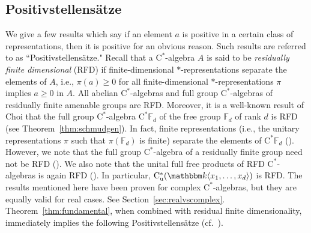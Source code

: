 \documentclass[12pt]{amsart}
\theoremstyle{definition}
\begin{document}
\subsection{Positivstellens\"atze}
We give a few results which say if an element $a$ is positive
in a certain class of representations, then it is positive for an obvious reason.
Such results are referred to as ``{Positiv\-stellen\-s\"atze\xspace}."
Recall that a {$\mathrm{C}^*$-alge\-bra\xspace} $A$ is said to be \emph{residually finite dimensional}
(RFD) if finite-dimensional {$*$-repre\-sen\-ta\-tion\xspace}{}s separate
the elements of $A$, i.e., $\pi(a)\geq0$ for all finite-dimensional
{$*$-repre\-sen\-ta\-tion\xspace}{}s $\pi$ implies $a\geq0$ in $A$.
All abelian {$\mathrm{C}^*$-alge\-bra\xspace}{}s and full group {$\mathrm{C}^*$-alge\-bra\xspace}{}s of
residually finite amenable groups are RFD.
Moreover, it is a well-known result of Choi that the full group {$\mathrm{C}^*$-alge\-bra\xspace} $\mathrm{C}^*{{\mathbb F}}_d$
of the free group ${{\mathbb F}}_d$ of rank $d$ is RFD (see Theorem~\ref{thm:schmudgen}).
In fact, finite representations (i.e., the unitary representations $\pi$
such that $\pi({{\mathbb F}}_d)$ is finite) separate the elements of $\mathrm{C}^*{{\mathbb F}}_d$ (\cite{ls}).
However, we note that the full group {$\mathrm{C}^*$-alge\-bra\xspace} of a residually finite group
need not be RFD (\cite{bekka}).
We also note that the unital full free products of RFD {$\mathrm{C}^*$-alge\-bra\xspace}{}s is
again RFD (\cite{el}). 
In particular, $\mathrm{C}^*_{\mathrm{u}}({{\mathbbm k}}\langle x_1,\ldots,x_d\rangle)$ is RFD.
The results mentioned here have been proven for complex {$\mathrm{C}^*$-alge\-bra\xspace}{}s,
but they are equally valid for real cases. See Section~\ref{sec:realvscomplex}.
Theorem~\ref{thm:fundamental}, when combined with residual finite dimensionality, immediately
implies the following {Positiv\-stellen\-s\"atze\xspace} (cf.\ \cite{putinar,hm}).
\end{document}
